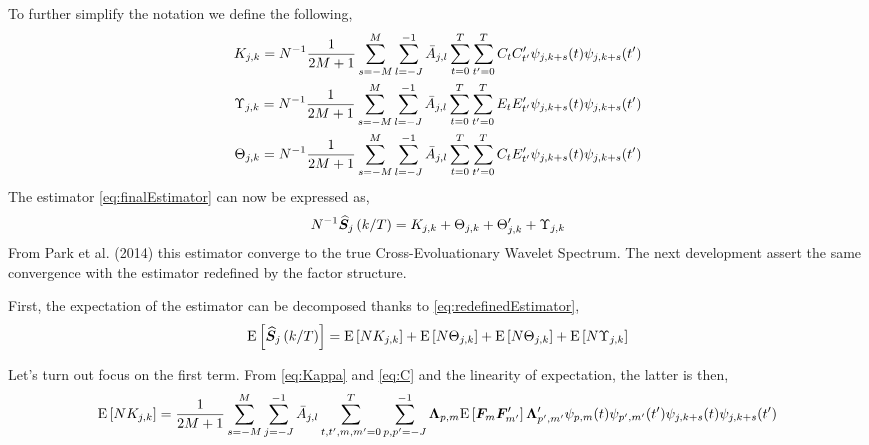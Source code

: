 \documentclass[main_document.tex]{subfiles}
\begin{document}
To further simplify the notation we define the following, 
\begin{align}
	K_{j,k} = N^{-1} \frac{\displaystyle 1}{\displaystyle 2M+1} \sum_{s=-M}^{M} \scalesum{l} \invA{j}{l} \locsum{t}\locsum{t'} C_t C_{t'}' \wavelet{j}{k+s}{t}\wavelet{j}{k+s}{t'} \label{eq:Kappa} \\
	\Upsilon_{j,k} = N^{-1} \frac{\displaystyle 1}{\displaystyle 2M+1} \sum_{s=-M}^{M} \scalesum{l} \invA{j}{l} \locsum{t}\locsum{t'} E_t E_{t'}' \wavelet{j}{k+s}{t}\wavelet{j}{k+s}{t'} \label{eq:Upsilon} \\
	\Theta_{j,k} = N^{-1} \frac{\displaystyle 1}{\displaystyle 2M+1} \sum_{s=-M}^{M} \scalesum{l} \invA{j}{l} \locsum{t}\locsum{t'} C_t E_{t'}' \wavelet{j}{k+s}{t}\wavelet{j}{k+s}{t'} \label{eq:Theta} 
\end{align}
The estimator \eqref{eq:finalEstimator} can now be expressed as, 
\begin{align}
	N^{-1} \widehat{\bm{S}}_{j}\left(k/T\right) = K_{j,k} + \Theta_{j,k} + \Theta_{j,k}' + \Upsilon_{j,k} \label{eq:redefinedEstimator}
\end{align}
From Park et al. (2014) this estimator converge to the true Cross-Evoluationary Wavelet Spectrum. The next development assert the same convergence with the estimator redefined by the factor structure. 

First, the expectation of the estimator can be decomposed thanks to \eqref{eq:redefinedEstimator},
\begin{align*}
	\mathrm{E}\left[\widehat{\bm{S}}_{j}\left(k/T\right)\right] = \mathrm{E}\left[N K_{j,k}\right] + \mathrm{E}\left[N \Theta_{j,k}\right] + \mathrm{E}\left[N \Theta_{j,k}\right] + \mathrm{E}\left[N \Upsilon_{j,k}\right]
\end{align*}

Let's turn out focus on the first term. From \eqref{eq:Kappa} and \eqref{eq:C} and the linearity of expectation, the latter is then, 
\begin{align*}
	\E{N K_{j,k}} = \frac{\displaystyle 1}{\displaystyle 2M+1}\sum_{s=-M}^{M} \scalesum{j} \invA{j}{l} \locsum{t,t',m,m'} \scalesum{p,p'} \loadings{p}{m} \E{\factors{m}\factors{m'}'} \loadings{p'}{m'}' \wavelet{p}{m}{t}\wavelet{p'}{m'}{t'}\wavelet{j}{k+s}{t}\wavelet{j}{k+s}{t'}
\end{align*}
\end{document}
